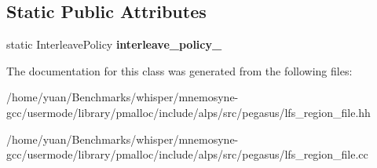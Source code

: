 \subsection*{Static Public Attributes}
\begin{DoxyCompactItemize}
\item 
static Interleave\+Policy {\bfseries interleave\+\_\+policy\+\_\+}\hypertarget{classalps_1_1LfsRegionFile_a1dbc8a71fb39f79ea0884ccf80495bfb}{}\label{classalps_1_1LfsRegionFile_a1dbc8a71fb39f79ea0884ccf80495bfb}

\end{DoxyCompactItemize}


The documentation for this class was generated from the following files\+:\begin{DoxyCompactItemize}
\item 
/home/yuan/\+Benchmarks/whisper/mnemosyne-\/gcc/usermode/library/pmalloc/include/alps/src/pegasus/lfs\+\_\+region\+\_\+file.\+hh\item 
/home/yuan/\+Benchmarks/whisper/mnemosyne-\/gcc/usermode/library/pmalloc/include/alps/src/pegasus/lfs\+\_\+region\+\_\+file.\+cc\end{DoxyCompactItemize}
